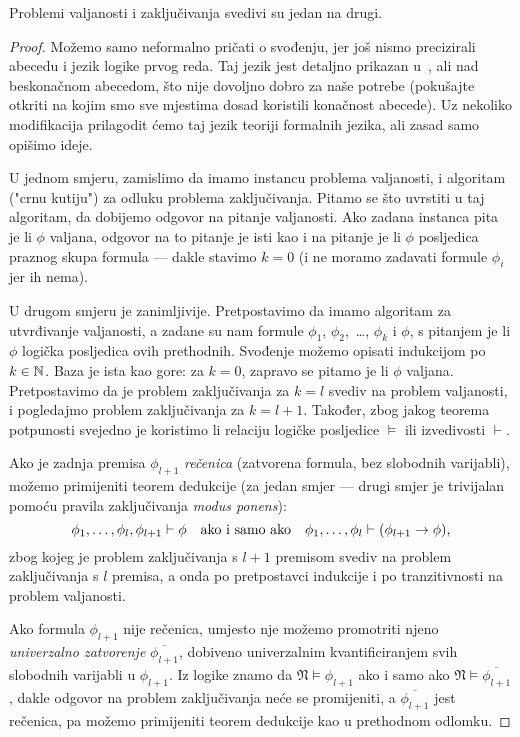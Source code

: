 \begin{propozicija}[{name=[međusobna svedivost valjanosti i zaključivanja]}]\label{pp:valj<>zaklj}
Problemi valjanosti i zaključivanja svedivi su jedan na drugi.
\end{propozicija}
\begin{proof}
Možemo samo neformalno pričati o svođenju, jer još nismo precizirali abecedu i jezik logike prvog reda. Taj jezik jest detaljno prikazan u~\cite{skr:VukML}, ali nad beskonačnom abecedom, što nije dovoljno dobro za naše potrebe (pokušajte otkriti na kojim smo sve mjestima dosad koristili konačnost abecede). Uz nekoliko modifikacija prilagodit ćemo taj jezik teoriji formalnih jezika, ali zasad samo opišimo ideje.

U jednom smjeru, zamislimo da imamo instancu problema valjanosti, i algoritam ("crnu kutiju") za odluku problema zaključivanja. Pitamo se što uvrstiti u taj algoritam, da dobijemo odgovor na pitanje valjanosti. Ako zadana instanca pita je li $\phi$ valjana, odgovor na to pitanje je isti kao i na pitanje je li $\phi$ posljedica praznog skupa formula --- dakle stavimo $k=0$ (i ne moramo zadavati formule $\phi_i$ jer ih nema).

U drugom smjeru je zanimljivije. Pretpostavimo da imamo algoritam za utvrđivanje valjanosti, a zadane su nam formule $\phi_1$, $\phi_2$,~\ldots, $\phi_k$ i $\phi$, s pitanjem je li $\phi$ logička posljedica ovih prethodnih. Svođenje možemo opisati indukcijom po $k\in{\mathbb N}$. Baza je ista kao gore: za $k=0$, zapravo se pitamo je li $\phi$ valjana. Pretpostavimo da je problem zaključivanja za $k=l$ svediv na problem valjanosti, i pogledajmo problem zaključivanja za $k=l+1$. Također, zbog jakog teorema potpunosti svejedno je koristimo li relaciju logičke posljedice $\models$ ili izvedivosti $\vdash$.

Ako je zadnja premisa $\phi_{l+1}$ \emph{rečenica} (zatvorena formula, bez slobodnih varijabli), možemo primijeniti teorem dedukcije (za jedan smjer --- drugi smjer je trivijalan pomoću pravila zaključivanja \emph{modus ponens}):
\begin{equation}\label{eq:prebaci}
\phi_1,\dotsc,\phi_l,\phi_{l+1}\vdash\phi\text{\quad ako i samo ako\quad}
\phi_1,\dotsc,\phi_l\vdash(\phi_{l+1}\to\phi)\text,
\end{equation}
zbog kojeg je problem zaključivanja s $l+1$ premisom svediv na problem zaključivanja s $l$ premisa, a onda po pretpostavci indukcije i po tranzitivnosti na problem valjanosti.

Ako formula $\phi_{l+1}$ nije rečenica, umjesto nje možemo promotriti njeno \emph{univerzalno zatvorenje} $\overline{\phi_{l+1}}$, dobiveno univerzalnim kvantificiranjem svih slobodnih varijabli u $\phi_{l+1}$. Iz logike znamo da $\mathfrak N\models\phi_{l+1}$ ako i samo ako $\mathfrak N\models\overline{\phi_{l+1}}$, dakle odgovor na problem zaključivanja neće se promijeniti, a $\overline{\phi_{l+1}}$ jest rečenica, pa možemo primijeniti teorem dedukcije kao u prethodnom odlomku.
\end{proof}
